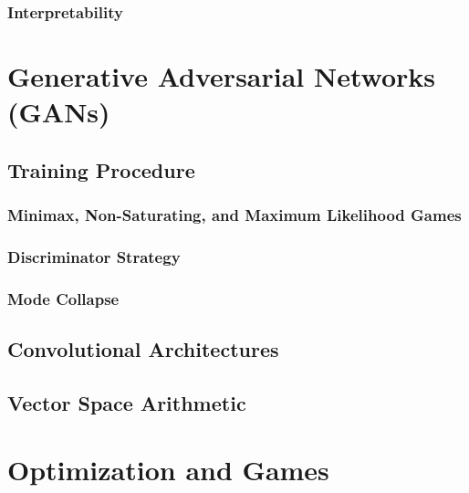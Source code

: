 			\subsubsection{Interpretability} %

	\section{Generative Adversarial Networks (GANs)} %

		\subsection{Training Procedure} %

			\subsubsection{Minimax, Non-Saturating, and Maximum Likelihood Games} %

			\subsubsection{Discriminator Strategy} %

			\subsubsection{Mode Collapse} %

		\subsection{Convolutional Architectures} %

		\subsection{Vector Space Arithmetic} %

	\section{Optimization and Games} %

